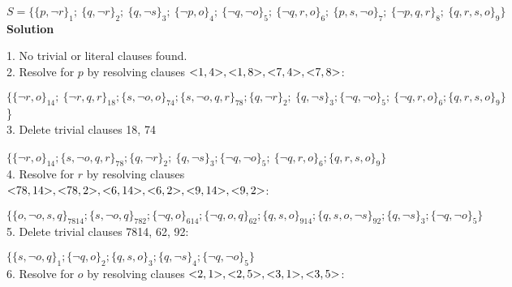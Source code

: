 \documentclass{article}
\newcommand{\solution}{\textbf{\large Solution}}
\begin{document}
\noindent
\small{
    $S = \{\{p, \neg{r}\}_{1};\ \{q, \neg{r}\}_{2};\ \{q, \neg{s}\}_{3};\ \{\neg{p},     o\}_{4};\ \{\neg{q}, \neg{o}\}_{5};\ \{\neg{q}, r, o\}_{6};\ \{p, s, \neg{o    }\}_{7};\ \{\neg{p}, q, r\}_{8};\ \{q, r, s, o\}_{9}\}$
}\\

\noindent
\solution


1. No trivial or literal clauses found.\\

2. Resolve for $p$ by resolving clauses $\text{\textless}1, 4\text{\textgreater}, \text{\textless}1, 8\text{\textgreater}, \text{\textless}7, 4\text{\textgreater}, \text{\textless}7, 8\text{\textgreater}$:

\small{$\{\{\neg{r}, o\}_{14};\ \{\neg{r}, q, r\}_{18}; \{s, \neg{o}, o\}_{74}; \{s, \neg{o}, q, r\}_{78}; \{q, \neg{r}\}_{2};\ \{q, \neg{s}\}_{3}; \{\neg{q}, \neg{o}\}_{5};\ \{\neg{q}, r, o\}_{6}; \{q, r, s, o\}_{9}\}$\}\\

3. Delete trivial clauses 18, 74

\small{
    $\{\{\neg{r}, o\}_{14}; \{s, \neg{o}, q, r\}_{78}; \{q, \neg{r}\}_{2};\ \{q, \neg{s}\}_{3}; \{\neg{q}, \neg{o}\}_{5};\ \{\neg{q}, r, o\}_{6}; \{q, r, s, o\}_{9}\}$\
}\\

4. Resolve for $r$ by resolving clauses $\text{\textless}78, 14\text{\textgreater}, \text{\textless}78, 2\text{\textgreater}, \text{\textless}6, 14\text{\textgreater}, \text{\textless}6, 2\text{\textgreater}, \text{\textless}9, 14\text{\textgreater}, \text{\textless}9, 2\text{\textgreater}$:

\small{
    $\{
        \{o, \neg{o}, s, q\}_{7814}; 
        \{s, \neg{o}, q\}_{782}; 
        \{\neg{q}, o\}_{614}; 
        \{\neg{q}, o, q\}_{62};
        \{q, s, o\}_{914}; 
        \{q, s, o, \neg{s}\}_{92}; 
        \{q, \neg{s}\}_{3}; 
        \{\neg{q}, \neg{o}\}_{5}
    \}$
}\\

5. Delete trivial clauses 7814, 62, 92:

\small{
    $\{
        \{s, \neg{o}, q\}_{1}; 
        \{\neg{q}, o\}_{2}; 
        \{q, s, o\}_{3}; 
        \{q, \neg{s}\}_{4}; 
        \{\neg{q}, \neg{o}\}_{5}
    \}$
}\\

6. Resolve for $o$ by resolving clauses $\text{\textless}2, 1\text{\textgreater}, \text{\textless}2, 5\text{\textgreater}, \text{\textless}3, 1\text{\textgreater}, \text{\textless}3, 5\text{\textgreater}$:

}
\end{document}
